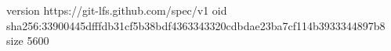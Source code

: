 version https://git-lfs.github.com/spec/v1
oid sha256:33900445dfffdb31cf5b38bdf4363343320cdbdae23ba7cf114b3933344897b8
size 5600
